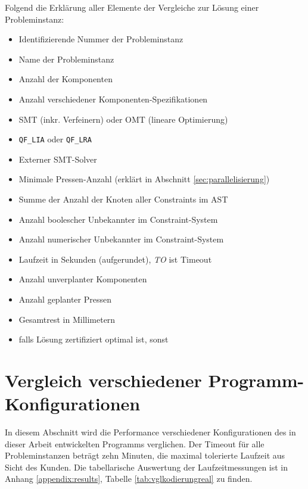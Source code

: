 Folgend die Erklärung aller Elemente der Vergleiche zur Lösung einer Probleminstanz:
\begin{itemize}
    \item {} Identifizierende Nummer der Probleminstanz
    \item {} Name der Probleminstanz
    \item {} Anzahl der Komponenten
    \item {} Anzahl verschiedener Komponenten-Spezifikationen
    \item {} SMT (inkr. Verfeinern) oder OMT (lineare Optimierung)
    \item {} \texttt{QF\_LIA} oder \texttt{QF\_LRA}
    \item {} Externer SMT-Solver
    \item {} Minimale Pressen-Anzahl (erklärt in Abschnitt \ref{sec:parallelisierung})
    \item {} Summe der Anzahl der Knoten aller Constraints im AST
    \item {} Anzahl boolescher Unbekannter im Constraint-System
    \item {} Anzahl numerischer Unbekannter im Constraint-System
    \item {} Laufzeit in Sekunden (aufgerundet), \textit{TO} ist Timeout
    \item {} Anzahl unverplanter Komponenten
    \item {} Anzahl geplanter Pressen
    \item {} Gesamtrest in Millimetern
    \item {} \cmark \; falls Lösung zertifiziert optimal ist, \xmark \; sonst
\end{itemize}

\section{Vergleich verschiedener Programm-Konfigurationen}
In diesem Abschnitt wird die Performance verschiedener Konfigurationen des in dieser Arbeit entwickelten Programms verglichen.
Der Timeout für alle Probleminstanzen beträgt zehn Minuten, die maximal tolerierte Laufzeit aus Sicht des Kunden.
Die tabellarische Auswertung der Laufzeitmessungen ist in Anhang \ref{appendix:results}, Tabelle \ref{tab:vglkodierungreal} zu finden.

